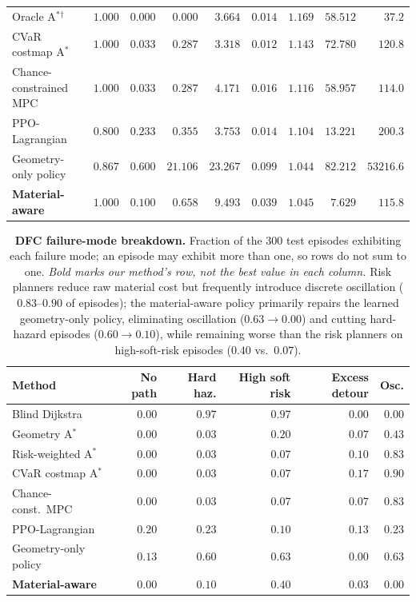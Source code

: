 \begin{table}[htbp]
{\begin{tabular}{lrrrrrrrr}
Oracle A$^*$$^\dagger$    & $1.000$ & $0.000$ & $0.000$  & $3.664$  & $0.014$ & $1.169$ & $58.512$ & $37.2$ \\
CVaR costmap A$^*$        & $1.000$ & $0.033$ & $0.287$  & $3.318$  & $0.012$ & $1.143$ & $72.780$ & $120.8$ \\
Chance-constrained MPC    & $1.000$ & $0.033$ & $0.287$  & $4.171$  & $0.016$ & $1.116$ & $58.957$ & $114.0$ \\
PPO-Lagrangian            & $0.800$ & $0.233$ & $0.355$  & $3.753$  & $0.014$ & $1.104$ & $13.221$ & $200.3$ \\
Geometry-only policy        & $0.867$ & $0.600$ & $21.106$ & $23.267$ & $0.099$ & $1.044$ & $82.212$ & $53216.6$ \\
\textbf{Material-aware}     & $\mathbf{1.000}$ & $\mathbf{0.100}$ & $\mathbf{0.658}$
                          & $\mathbf{9.493}$ & $\mathbf{0.039}$ & $\mathbf{1.045}$
                          & $\mathbf{7.629}$ & $\mathbf{115.8}$ \\
\bottomrule
\end{tabular}}
\end{table}

\begin{table}[htbp]
\centering
\caption{\textbf{DFC failure-mode breakdown.}
Fraction of the $300$ test episodes exhibiting each failure mode; an episode may
exhibit more than one, so rows do not sum to one.
\emph{Bold marks our method's row, not the best value in each column.}
Risk planners reduce raw material cost but frequently introduce discrete
oscillation ($0.83$--$0.90$ of episodes); the material-aware policy primarily
repairs the learned geometry-only policy, eliminating oscillation
($0.63\!\to\!0.00$) and cutting hard-hazard episodes ($0.60\!\to\!0.10$),
while remaining worse than the risk planners on high-soft-risk episodes
($0.40$ vs.\ $0.07$).}
\label{tab:app_dfc_failure_modes}
\scriptsize
\setlength{\tabcolsep}{4pt}
\renewcommand{\arraystretch}{1.08}
\begin{tabular}{lrrrrr}
\toprule
Method & No path & Hard haz. & High soft risk & Excess detour & Osc. \\
\midrule
Blind Dijkstra         & $0.00$ & $0.97$ & $0.97$ & $0.00$ & $0.00$ \\
Geometry A$^*$         & $0.00$ & $0.03$ & $0.20$ & $0.07$ & $0.43$ \\
Risk-weighted A$^*$    & $0.00$ & $0.03$ & $0.07$ & $0.10$ & $0.83$ \\
CVaR costmap A$^*$     & $0.00$ & $0.03$ & $0.07$ & $0.17$ & $0.90$ \\
Chance-const.\ MPC     & $0.00$ & $0.03$ & $0.07$ & $0.07$ & $0.83$ \\
PPO-Lagrangian         & $0.20$ & $0.23$ & $0.10$ & $0.13$ & $0.23$ \\
Geometry-only policy     & $0.13$ & $0.60$ & $0.63$ & $0.00$ & $0.63$ \\
\textbf{Material-aware}  & $\mathbf{0.00}$ & $\mathbf{0.10}$ & $\mathbf{0.40}$
                       & $\mathbf{0.03}$ & $\mathbf{0.00}$ \\
\bottomrule
\end{tabular}
\end{table}

